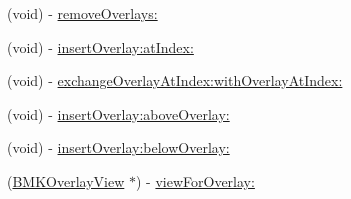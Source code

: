 \begin{DoxyCompactItemize}
\item 
(void) -\/ \hyperlink{interface_b_m_k_map_view_a3eb7909fb1adce117c1de432fd5d816a}{remove\-Overlays\-:}
\item 
(void) -\/ \hyperlink{interface_b_m_k_map_view_adc0775a2651c1e4099f93d9c1bbffe3d}{insert\-Overlay\-:at\-Index\-:}
\item 
(void) -\/ \hyperlink{interface_b_m_k_map_view_a62c1c29b8e5b408ba0c40411a3c1f50f}{exchange\-Overlay\-At\-Index\-:with\-Overlay\-At\-Index\-:}
\item 
(void) -\/ \hyperlink{interface_b_m_k_map_view_ad94b45c4df7978e3a6095918323496d3}{insert\-Overlay\-:above\-Overlay\-:}
\item 
(void) -\/ \hyperlink{interface_b_m_k_map_view_a73dfe9f74d722b7b1fc477e791f34653}{insert\-Overlay\-:below\-Overlay\-:}
\item 
(\hyperlink{interface_b_m_k_overlay_view}{B\-M\-K\-Overlay\-View} $\ast$) -\/ \hyperlink{interface_b_m_k_map_view_aa88093440ad22f7af9cf9a36051f662d}{view\-For\-Overlay\-:}
\end{DoxyCompactItemize}
